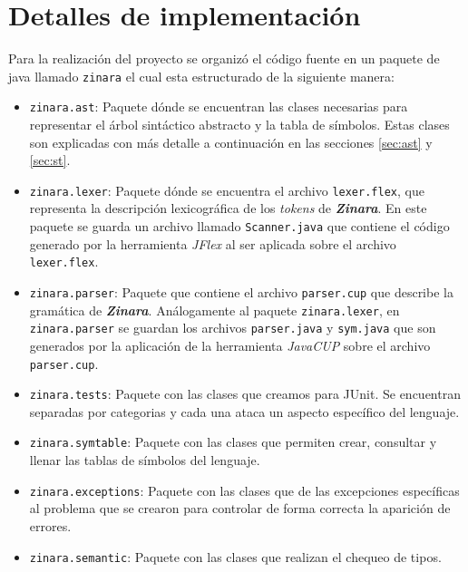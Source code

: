 \documentclass[12pt, spanish]{report}
\begin{document}
\section{Detalles de implementaci\'on}
\label{sec:codigo}

Para la realizaci\'on del proyecto se organiz\'o el c\'odigo fuente en un
paquete de java llamado \texttt{zinara} el cual esta estructurado de
la siguiente manera:

\begin{itemize}
 \item \texttt{zinara.ast}: Paquete d\'onde se encuentran las clases
       necesarias para representar el \'arbol sint\'actico abstracto y la tabla
       de s\'imbolos. Estas clases son explicadas con m\'as detalle a
       continuaci\'on en las secciones \ref{sec:ast} y \ref{sec:st}.
       
 \item \texttt{zinara.lexer}: Paquete d\'onde se encuentra el archivo
       \texttt{lexer.flex}, que representa la descripci\'on lexicogr\'afica de
       los \emph{tokens} de \emph{\textbf{Zinara}}. En este paquete se
       guarda un archivo llamado \texttt{Scanner.java} que contiene el
       c\'odigo generado por la herramienta \emph{JFlex} al ser aplicada
       sobre el archivo \texttt{lexer.flex}.
       
 \item \texttt{zinara.parser}: Paquete que contiene el archivo
       \texttt{parser.cup} que describe la gram\'atica de
       \emph{\textbf{Zinara}}. An\'alogamente al paquete
       \texttt{zinara.lexer}, en \texttt{zinara.parser} se guardan los
       archivos \texttt{parser.java} y \texttt{sym.java} que son generados
       por la aplicaci\'on de la herramienta \emph{JavaCUP} sobre el archivo
       \texttt{parser.cup}.
       
 \item \texttt{zinara.tests}: Paquete con las clases que creamos para
       JUnit. Se encuentran separadas por categorias y cada una ataca un
       aspecto espec\'ifico del lenguaje.
       
 \item \texttt{zinara.symtable}: Paquete con las clases que permiten
       crear, consultar y llenar las tablas de s\'imbolos del lenguaje.

 \item \texttt{zinara.exceptions}: Paquete con las clases que de las
       excepciones espec\'ificas al problema que se crearon para
       controlar de forma correcta la aparici\'on de errores.

 \item \texttt{zinara.semantic}: Paquete con las clases que realizan el
       chequeo de tipos.


\end{itemize}
\end{document}
